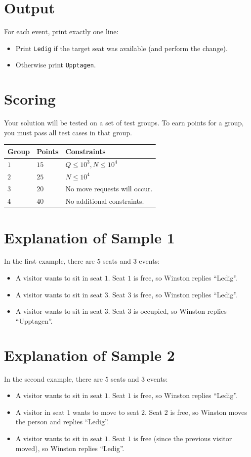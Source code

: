 \section*{Output}
For each event, print exactly one line:
\begin{itemize}
  \item Print \verb|Ledig| if the target seat was available (and perform the change).
  \item Otherwise print \verb|Upptagen|.
\end{itemize}

\section*{Scoring}
Your solution will be tested on a set of test groups.
To earn points for a group, you must pass all test cases in that group.

\noindent
\begin{tabular}{| l | l | p{12cm} |}
  \hline
  \textbf{Group} & \textbf{Points} & \textbf{Constraints} \\ \hline
  $1$    & $15$  & $Q \le 10^3, N \le 10^4$ \\ \hline
  $2$    & $25$  & $N \le 10^4$ \\ \hline
  $3$    & $20$  & No move requests will occur. \\ \hline
  $4$    & $40$  & No additional constraints. \\ \hline
\end{tabular}

\section*{Explanation of Sample 1}

In the first example, there are $5$ seats and $3$ events:
\begin{itemize}
  \item A visitor wants to sit in seat $1$. Seat $1$ is free, so Winston replies ``Ledig''.
  \item A visitor wants to sit in seat $3$. Seat $3$ is free, so Winston replies ``Ledig''.
  \item A visitor wants to sit in seat $3$. Seat $3$ is occupied, so Winston replies ``Upptagen''.
\end{itemize}

\section*{Explanation of Sample 2}
In the second example, there are $5$ seats and $3$ events:
\begin{itemize}
  \item A visitor wants to sit in seat $1$. Seat $1$ is free, so Winston replies ``Ledig''.
  \item A visitor in seat $1$ wants to move to seat $2$. Seat $2$ is free, so Winston moves the person and replies ``Ledig''.
  \item A visitor wants to sit in seat $1$. Seat $1$ is free (since the previous visitor moved), so Winston replies ``Ledig''.
\end{itemize}
